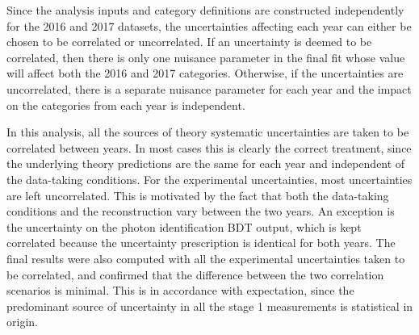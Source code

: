 Since the analysis inputs and category definitions are constructed independently 
for the 2016 and 2017 datasets, %
the uncertainties affecting each year can either be chosen to be correlated or uncorrelated.
If an uncertainty is deemed to be correlated, 
then there is only one nuisance parameter in the final fit 
whose value will affect both the 2016 and 2017 categories.
Otherwise, if the uncertainties are uncorrelated, there is a separate nuisance parameter for each year 
and the impact on the categories from each year is independent.

In this analysis, 
all the sources of theory systematic uncertainties are taken to be correlated between years.
In most cases this is clearly the correct treatment, %
since the underlying theory predictions are the same for each year 
and independent of the data-taking conditions.
For the experimental uncertainties,
most uncertainties are left uncorrelated.
This is motivated by the fact that both the data-taking conditions 
and the reconstruction vary between the two years.
An exception is the uncertainty on the photon identification BDT output, 
which is kept correlated because the uncertainty prescription is identical for both years.
The final results were also computed with all the experimental uncertainties taken to be correlated, 
and confirmed that the difference between the two correlation scenarios is minimal.
This is in accordance with expectation, since the predominant source of uncertainty 
in all the stage 1 measurements is statistical in origin.
